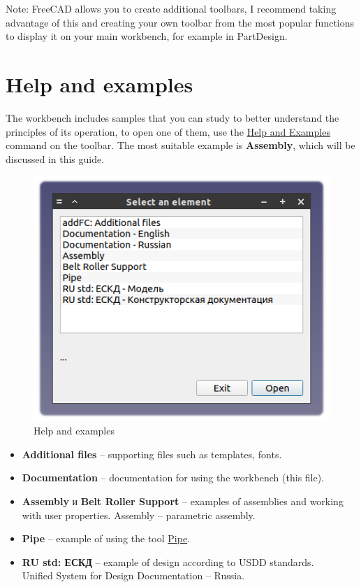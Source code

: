 \documentclass[a4paper,12pt]{article}
\begin{document}
Note: FreeCAD allows you to create additional toolbars, I recommend taking advantage of this and creating your own toolbar from the most popular functions to display it on your main workbench, for example in PartDesign.

\pagebreak




\section{Help and examples}

The workbench includes samples that you can study to better understand the principles of its operation, to open one of them, use the \hyperref[sec:9]{Help and Examples} command on the toolbar.
The most suitable example is \textbf{Assembly}, which will be discussed in this guide.

\begin{figure}[htp]
	\centering
	\includegraphics[scale=1]{img/assistant.png}
	\caption{Help and examples}
	\label{sec:assistant}
\end{figure}

\begin{itemize}
	\item \textbf{Additional files} -- supporting files such as templates, fonts.
	\item \textbf{Documentation} -- documentation for using the workbench (this file).
	\item \textbf{Assembly} и \textbf{Belt Roller Support} -- examples of assemblies and working with user properties. Assembly -- parametric assembly.
	\item \textbf{Pipe} -- example of using the tool \hyperref[sec:6]{Pipe}.
	\item \textbf{RU std: ЕСКД} -- example of design according to USDD standards.\\Unified System for Design Documentation -- Russia.
\end{itemize}
\end{document}
